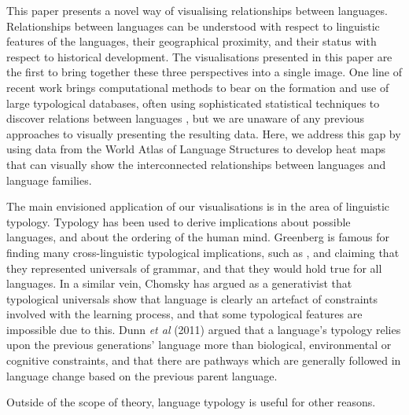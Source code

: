 \documentclass[11pt]{article}
\begin{document}
This paper presents a novel way of visualising relationships between languages. Relationships between languages can be understood with respect to linguistic features of the languages, their geographical proximity, and their status with respect to historical development. The visualisations presented in this paper are the first to bring together these three perspectives into a single image. One line of recent work brings computational methods to bear on the formation and use of large typological databases, often using sophisticated statistical techniques to discover relations between languages \cite[e.g.]{daume07implication,daume09areal}, but we are unaware of any previous approaches to visually presenting the resulting data.
Here, we address this gap by using data from the World Atlas of Language Structures \cite{wals-2011} to develop heat maps that can visually show the interconnected relationships between languages and language families. 

The main envisioned application of our visualisations is in the area of linguistic typology. Typology has been used to derive implications about possible languages, and about the ordering of the human mind. Greenberg  is famous for finding many cross-linguistic typological implications, such as %
, and claiming that they represented universals of grammar, and that they would hold true for all languages. In a similar vein, Chomsky %
has argued as a generativist that typological universals show that language is clearly an artefact of constraints involved with the learning process, and that some typological features are impossible due to this. Dunn {\it et al} (2011) %
argued that a language's typology relies upon the previous generations' language more than biological, environmental or cognitive constraints, and that there are pathways which are generally followed in language change based on the previous parent language. 

Outside of the scope of theory, language typology is useful for other reasons. %
\end{document}
